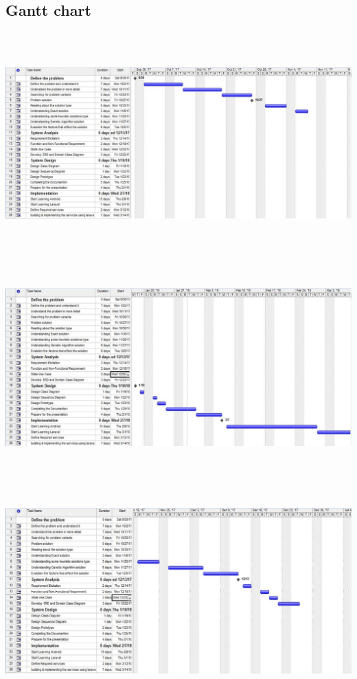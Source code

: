 \documentclass[12pt]{article}
\begin{document}
\subsection{ Gantt chart }

\includegraphics[width=17cm,height=8.5cm]{./assets/ganttchart/gantt-1.png}\\
\includegraphics[width=17cm,height=8.5cm]{./assets/ganttchart/gantt-2.png}\\
\includegraphics[width=17cm,height=8.5cm]{./assets/ganttchart/gantt-3.png}\\
\end{document}

